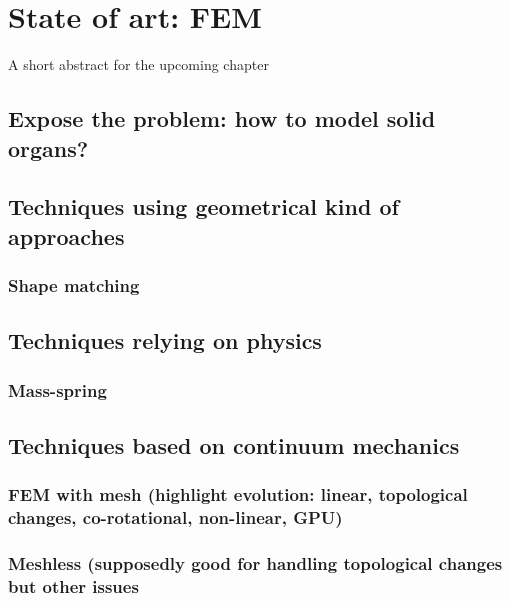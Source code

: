 \chapter{State of art: FEM}
\label{chap4}
\begin{shortAbstract}
A short abstract for the upcoming chapter
\end{shortAbstract}


\section{Expose the problem: how to model solid organs?}

\section{Techniques using geometrical kind of approaches}
	\subsection{Shape matching}
	\section{Techniques relying on physics}
	\subsection{Mass-spring}
		
\section{Techniques based on continuum mechanics}	
	\subsection{FEM with mesh (highlight evolution: linear, topological changes, co-rotational, non-linear, GPU)}
	\subsection{Meshless (supposedly good for handling topological changes but other issues}